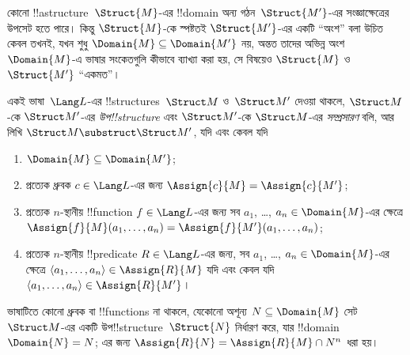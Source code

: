 \documentclass[../../../include/open-logic-section]{subfiles}
\begin{document}

কোনো !!a{structure}~$\Struct{M}$-এর !!{domain} অন্য
গঠন~$\Struct{M'}$-এর সংজ্ঞাক্ষেত্রের উপসেট হতে পারে। কিন্তু
$\Struct{M}$-কে স্পষ্টতই $\Struct{M'}$-এর একটি “অংশ” বলা উচিত কেবল তখনই,
যখন শুধু $\Domain{M} \subseteq \Domain{M'}$ নয়, অন্তত তাদের অভিন্ন
অংশ~$\Domain{M}$-এ ভাষার সংকেতগুলি কীভাবে ব্যাখ্যা করা হয়, সে বিষয়েও
$\Struct{M}$ ও~$\Struct{M'}$ “একমত”।

\begin{defn}
একই ভাষা~$\Lang L$-এর !!{structure}s~$\Struct M$ ও~$\Struct M'$ দেওয়া
থাকলে, $\Struct M$-কে $\Struct M'$-এর \emph{উপ!!{structure}} এবং
$\Struct M'$-কে $\Struct M$-এর \emph{সম্প্রসারণ} বলি, আর লিখি
$\Struct M \substruct \Struct M'$, যদি এবং কেবল যদি
\begin{enumerate}
\item $\Domain{M} \subseteq \Domain{M'}$;
\item প্রত্যেক ধ্রুবক $c \in \Lang L$-এর জন্য $\Assign{c}{M} =
    \Assign{c}{M'}$;
\item প্রত্যেক $n$-স্থানীয় !!{function} $f \in \Lang L$-এর জন্য
  সব $a_1$, \dots, $a_n \in \Domain{M}$-এর ক্ষেত্রে
  $\Assign{f}{M}(a_1, \dots, a_n) = \Assign{f}{M'}(a_1, \dots, a_n)$;
\item প্রত্যেক $n$-স্থানীয় !!{predicate} $R \in \Lang L$-এর জন্য,
  সব $a_1$, \dots, $a_n \in \Domain{M}$-এর ক্ষেত্রে $\langle
  a_1, \dots, a_n\rangle \in \Assign{R}{M}$ যদি এবং কেবল যদি
  $\langle a_1, \dots, a_n\rangle \in \Assign{R}{M'}$।
\end{enumerate}
\end{defn}

\begin{rem}
ভাষাটিতে কোনো ধ্রুবক বা !!{function}s না থাকলে, যেকোনো অশূন্য $N
\subseteq \Domain{M}$ সেট~$\Struct M$-এর একটি
উপ!!{structure}~$\Struct{N}$ নির্ধারণ করে,
যার !!{domain}~$\Domain{N} = N$; এর জন্য $\Assign{R}{N} =
\Assign{R}{M} \cap N^n$ ধরা হয়।
\end{rem}

\end{document}
